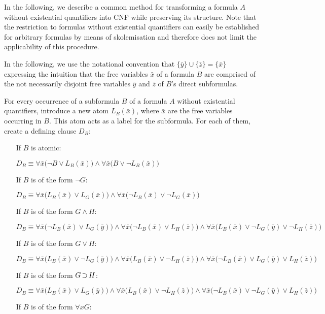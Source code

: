 In the following, we describe a common method for transforming a formula $A$ without existential quantifiers into CNF while preserving its structure.
Note that the restriction to formulas without existential quantifiers can easily be established for arbitrary formulas by means of skolemisation and therefore does not limit the applicability of this procedure.

In the following, we use the notational convention that $\{\bar y\} \cup \{\bar z\} = \{\bar x\}$ expressing the intuition that the free variables $\bar x$ of a formula $B$ are comprised of the not necessarily disjoint free variables  $\bar y$ and $\bar z$ of $B$'s direct subformulas.

\begin{defi}
	For every occurrence of a subformula $B$ of a formula $A$ without existential quantifiers, introduce a new atom $L_B(\bar x)$, where $\bar x$ are the free variables occurring in $B$.
	This atom acts as a label for the subformula. 
	For each of them, create a defining clause $D_B$:

	\begin{itemize}
		\item[If $B$ is atomic:]~

			$D_B\equiv \forall \bar x \big(\lnot B \lor L_B(\bar x)\big) \land \forall \bar x \big(B \lor \lnot L_B(\bar x)\big)  $
		\item[If $B$ is of the form $\lnot G$:]~

			$D_B\equiv \forall \bar x \big(L_B(\bar x) \lor L_G(\bar x)\big) \land \forall \bar x \big(\lnot L_B(\bar x) \lor \lnot L_G(\bar x)\big)$
		\item[If $B$ is of the form $G \land H$:]~

			$D_B\equiv \forall \bar x \big(\lnot L_B(\bar x) \lor L_G(\bar y)\big) \land \forall \bar x \big(\lnot L_B(\bar x) \lor L_H(\bar z)\big) \land \forall \bar x \big(L_B(\bar x) \lor \lnot L_G(\bar y) \lor \lnot L_H(\bar z)\big)  $
		\item[If $B$ is of the form $G \lor H$:]~

			$D_B\equiv \forall \bar x \big(L_B(\bar x) \lor \lnot L_G(\bar y)\big) \land \forall \bar x \big(L_B(\bar x) \lor \lnot L_H(\bar z)\big) \land \forall \bar x \big(\lnot L_B(\bar x) \lor L_G(\bar y) \lor L_H(\bar z)\big)$
		\item[If $B$ is of the form $G \operatorname{\supset} H$:]~

			$D_B\equiv \forall \bar x \big(L_B(\bar x) \lor L_G(\bar y)\big) \land
			\forall \bar x \big(L_B(\bar x) \lor \lnot L_H(\bar z)\big) \land \forall \bar x \big(\lnot L_B(\bar x) \lor \lnot L_G(\bar y) \lor L_H(\bar z)\big)  $
		\item[If $B$ is of the form $\forall x G$:]~


\end{itemize}
\end{defi}
